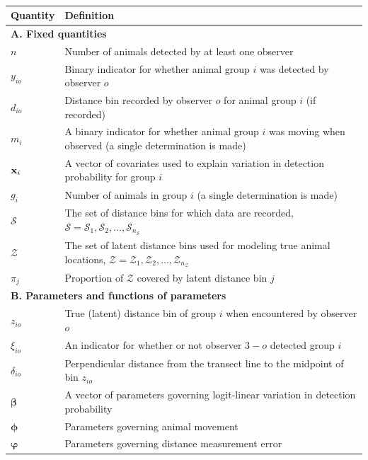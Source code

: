 \documentclass[12pt,fleqn]{article}
\begin{document}
\pagebreak
\begin{table}[ht]
\caption{
}
\label{tab:notation}
\raggedright
\begin{tabular}{p{2cm}p{13cm}}
  \hline
   Quantity & Definition \\
  \hline
   \multicolumn{2}{l}{\textbf{A. Fixed quantities}}   \\
  $n$ & Number of animals detected by at least one observer \\
  $y_{io}$ & Binary indicator for whether animal group $i$ was detected by observer $o$\\
  $d_{io}$ & Distance bin recorded by observer $o$ for animal group $i$ (if recorded) \\
  $m_{i}$ & A binary indicator for whether animal group $i$ was moving when observed (a single determination is made) \\
  ${\bf x}_i$ & A vector of covariates used to explain variation in detection probability for group $i$ \\
  $g_i$ & Number of animals in group $i$ (a single determination is made) \\
  $\mathcal{S}$ & The set of distance bins for which data are recorded, $\mathcal{S}=\mathcal{S}_1,\mathcal{S}_2,\hdots,\mathcal{S}_{n_\mathcal{S}}$ \\
  $\mathcal{Z}$ & The set of latent distance bins used for modeling true animal locations, $\mathcal{Z}=\mathcal{Z}_1,\mathcal{Z}_2,\hdots,\mathcal{Z}_{n_\mathcal{Z}}$
  \\
  $\pi_j$ & Proportion of $\mathcal{Z}$ covered by latent distance bin $j$ \\
  \multicolumn{2}{l}{\textbf{B. Parameters and functions of parameters}} \\
  $z_{io}$ & True (latent) distance bin of group $i$ when encountered by observer $o$ \\
  $\xi_{io}$ & An indicator for whether or not observer $3-o$ detected group $i$ \\
  $\delta_{io}$ & Perpendicular distance from the transect line to the midpoint of bin $z_{io}$ \\
  $\boldsymbol{\beta}$ & A vector of parameters governing logit-linear variation in detection probability \\
  $\boldsymbol{\phi}$ & Parameters governing animal movement \\
  $\boldsymbol{\varphi}$ & Parameters governing distance measurement error \\

\end{tabular}
\end{table}
\end{document}
